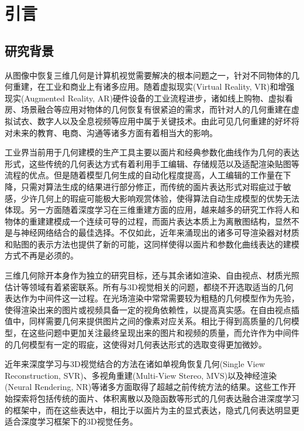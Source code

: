\chapter{引言}\label{chap:introduction}

\section{研究背景}
从图像中恢复三维几何是计算机视觉需要解决的根本问题之一，针对不同物体的几何重建，在工业和商业上有诸多应用。随着虚拟现实(Virtual Reality, VR)和增强现实(Augmented Reality, AR)硬件设备的工业流程进步，诸如线上购物、虚拟看房、场景融合等应用对物体的几何恢复有很紧迫的需求，而针对人的几何重建在虚拟试衣、数字人以及全息视频等应用中属于关键技术。由此可见几何重建的好坏将对未来的教育、电商、沟通等诸多方面有着相当大的影响。

工业界当前用于几何建模的生产工具主要以面片和经典参数化曲线作为几何的表达形式，这些传统的几何表达方式有着利用手工编辑、存储规范以及适配渲染贴图等流程的优点。但是随着模型几何生成的自动化程度提高，人工编辑的工作量在下降，只需对算法生成的结果进行部分修正，而传统的面片表达形式对瑕疵过于敏感，少许几何上的瑕疵可能极大影响观赏体验，使得算法自动生成模型的优势无法体现。另一方面随着深度学习在三维重建方面的应用，越来越多的研究工作将人和物体的重建建模成一个连续可导的过程，而面片表达本质上为离散图结构，显然不是与神经网络结合的最佳选择。不仅如此，近年来涌现出的诸多可导渲染器对材质和贴图的表示方法也提供了新的可能，这同样使得以面片和参数化曲线表达的建模方式不再是必须的。

三维几何除开本身作为独立的研究目标，还与其余诸如渲染、自由视点、材质光照估计等领域有着紧密联系。所有与3D视觉相关的问题，都绕不开选取适当的几何表达作为中间件这一过程。在光场渲染中常常需要较为粗糙的几何模型作为先验，使得渲染出来的图片或视频具备一定的视角依赖性，以提高真实感。在自由视点插值中，同样需要几何来提供图片之间的像素对应关系。相比于得到高质量的几何模型，在这些问题中更加关注最终呈现出来的图片和视频的质量，而允许作为中间件的几何模型有一定的瑕疵，这使得对几何表达形式的选取变得更加微妙。

近年来深度学习与3D视觉结合的方法在诸如单视角恢复几何(Single View Reconstruction, SVR)、多视角重建(Multi-View Stereo, MVS)以及神经渲染(Neural Rendering, NR)等诸多方面取得了超越之前传统方法的结果\citep{jiang2020sdfdiff, mildenhall2020nerf, park2019cvpr, saito2019pifu, meshcheder2019cvpr}。这些工作开始探索将包括传统的面片、体积离散以及隐函数等形式的几何表达融合进深度学习的框架中，而在这些表达中，相比于以面片为主的显式表达，隐式几何表达明显更适合深度学习框架下的3D视觉任务。



